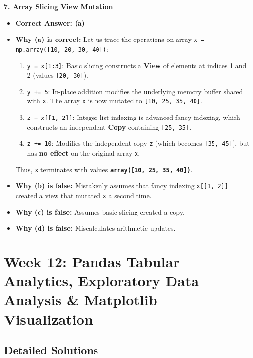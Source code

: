 \textbf{7. Array Slicing View Mutation}
\begin{itemize}
    \item \textbf{Correct Answer: (a)}
    \item \textbf{Why (a) is correct:}
    Let us trace the operations on array \texttt{x = np.array([10, 20, 30, 40])}:
    \begin{enumerate}
        \item \texttt{y = x[1:3]}: Basic slicing constructs a \textbf{View} of elements at indices 1 and 2 (values \texttt{[20, 30]}).
        \item \texttt{y += 5}: In-place addition modifies the underlying memory buffer shared with \texttt{x}.
        The array \texttt{x} is now mutated to \texttt{[10, 25, 35, 40]}.
        \item \texttt{z = x[[1, 2]]}: Integer list indexing is advanced fancy indexing, which constructs an independent \textbf{Copy} containing \texttt{[25, 35]}.
        \item \texttt{z += 10}: Modifies the independent copy \texttt{z} (which becomes \texttt{[35, 45]}), but has \textbf{no effect} on the original array \texttt{x}.
    \end{enumerate}
    Thus, \texttt{x} terminates with values \textbf{\texttt{array([10, 25, 35, 40])}}.
    \item \textbf{Why (b) is false:} Mistakenly assumes that fancy indexing \texttt{x[[1, 2]]} created a view that mutated \texttt{x} a second time.
    \item \textbf{Why (c) is false:} Assumes basic slicing created a copy.
    \item \textbf{Why (d) is false:} Miscalculates arithmetic updates.
\end{itemize}

\section*{Week 12: Pandas Tabular Analytics, Exploratory Data Analysis \& Matplotlib Visualization}

\subsection*{Detailed Solutions}


